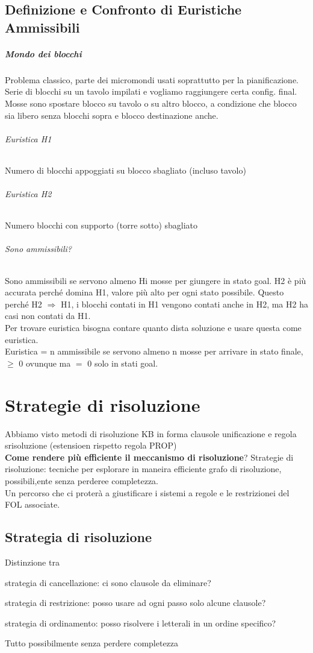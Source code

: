 \documentclass[10pt]{book}
\begin{document}
\section{Definizione e Confronto di Euristiche Ammissibili}
\paragraph{Mondo dei blocchi} Problema classico, parte dei micromondi usati soprattutto per la pianificazione. Serie di blocchi su un tavolo impilati e vogliamo raggiungere certa config. final. Mosse sono spostare blocco su tavolo o su altro blocco, a condizione che blocco sia libero senza blocchi sopra e blocco destinazione anche.
\subparagraph{Euristica H1} Numero di blocchi appoggiati su blocco sbagliato (incluso tavolo)
\subparagraph{Euristica H2} Numero blocchi con supporto (torre sotto) sbagliato
\subparagraph{Sono ammissibili?} Sono ammissibili se servono almeno Hi mosse per giungere in stato goal. H2 è più accurata perché domina H1, valore più alto per ogni stato possibile. Questo perché H2 $\Rightarrow$ H1, i blocchi contati in H1 vengono contati anche in H2, ma H2 ha casi non contati da H1.\\
Per trovare euristica bisogna contare quanto dista soluzione e usare questa come euristica.\\
Euristica = n ammissibile se servono almeno n mosse per arrivare in stato finale, $\geq$ 0 ovunque ma $=$ 0 solo in stati goal.

\chapter{Strategie di risoluzione}
Abbiamo visto metodi di risoluzione KB in forma clausole unificazione e regola srisoluzione (estensioen rispetto regola PROP)\\
\textbf{Come rendere più efficiente il meccanismo di risoluzione}? Strategie di risoluzione: tecniche per esplorare in maneira efficiente grafo di risoluzione, possibili,ente senza perderee completezza.\\
Un percorso che ci proterà a giustificare i sistemi a regole e le restrizionei del FOL associate.
\section{Strategia di risoluzione}
Distinzione tra 
	\begin{list}{}{}
		\item strategia di cancellazione: ci sono clausole da eliminare?
		\item strategia di restrizione: posso usare ad ogni passo solo alcune clausole?
		\item strategia di ordinamento: posso risolvere i letterali in un ordine specifico?
	\end{list}
Tutto possibilmente senza perdere completezza
\end{document}
